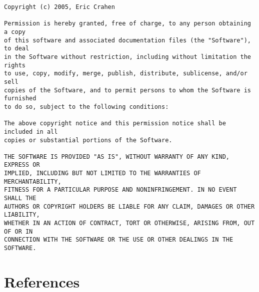 \documentclass{InsightArticle}
\begin{document}
\begin{verbatim}
Copyright (c) 2005, Eric Crahen

Permission is hereby granted, free of charge, to any person obtaining a copy
of this software and associated documentation files (the "Software"), to deal
in the Software without restriction, including without limitation the rights
to use, copy, modify, merge, publish, distribute, sublicense, and/or sell
copies of the Software, and to permit persons to whom the Software is furnished
to do so, subject to the following conditions:

The above copyright notice and this permission notice shall be included in all
copies or substantial portions of the Software.

THE SOFTWARE IS PROVIDED "AS IS", WITHOUT WARRANTY OF ANY KIND, EXPRESS OR
IMPLIED, INCLUDING BUT NOT LIMITED TO THE WARRANTIES OF MERCHANTABILITY,
FITNESS FOR A PARTICULAR PURPOSE AND NONINFRINGEMENT. IN NO EVENT SHALL THE
AUTHORS OR COPYRIGHT HOLDERS BE LIABLE FOR ANY CLAIM, DAMAGES OR OTHER LIABILITY,
WHETHER IN AN ACTION OF CONTRACT, TORT OR OTHERWISE, ARISING FROM, OUT OF OR IN
CONNECTION WITH THE SOFTWARE OR THE USE OR OTHER DEALINGS IN THE SOFTWARE.

\end{verbatim}

\section*{References}


\end{document}
